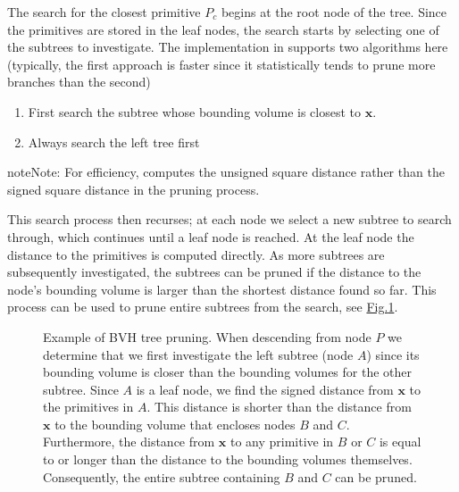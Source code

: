 \documentclass[letterpaper,10pt,english]{sphinxmanual}
\let\sphinxpxdimen\pdfpxdimen\else\newdimen\sphinxpxdimen
\begin{document}
The search for the closest primitive \(P_c\) begins at the root node of the tree.
Since the primitives are stored in the leaf nodes, the search starts by selecting one of the sub\sphinxhyphen{}trees to investigate.
The implementation in  supports two algorithms here (typically, the first approach is faster since it statistically tends to prune more branches than the second)
\begin{enumerate}
%
\item {} 
First search the sub\sphinxhyphen{}tree whose bounding volume is closest to \(\mathbf{x}\).

\item {} 
Always search the left tree first

\end{enumerate}

\begin{sphinxadmonition}{note}{Note:}
For efficiency,  computes the unsigned square distance rather than the signed square distance in the pruning process.
\end{sphinxadmonition}

This search process then recurses; at each node we select a new sub\sphinxhyphen{}tree to search through, which continues until a leaf node is reached.
At the leaf node the distance to the primitives is computed directly.
As more sub\sphinxhyphen{}trees are subsequently investigated, the sub\sphinxhyphen{}trees can be pruned if the distance to the node’s bounding volume is larger than the shortest distance found so far.
This process can be used to prune entire subtrees from the search, see \hyperref[\detokenize{Utilities/ComplexGeometries:fig-treepruning}]{Fig.\@ \ref{\detokenize{Utilities/ComplexGeometries:fig-treepruning}}}.

\begin{figure}[htb]
\centering
\capstart

\noindent\sphinxincludegraphics[width=480\sphinxpxdimen]{{TreePruning}.png}
\caption{Example of BVH tree pruning. When descending from node \(P\) we determine that we first investigate the left subtree (node \(A\)) since its bounding volume is closer than the bounding volumes for the other subtree.
Since \(A\) is a leaf node, we find the signed distance from \(\mathbf{x}\) to the primitives in \(A\).
This distance is shorter than the distance from \(\mathbf{x}\) to the bounding volume that encloses nodes \(B\) and \(C\).
Furthermore, the distance from \(\mathbf{x}\) to any primitive in \(B\) or \(C\) is equal to or longer than the distance to the bounding volumes themselves.
Consequently, the entire subtree containing \(B\) and \(C\) can be pruned.}\label{\detokenize{Utilities/ComplexGeometries:id6}}\label{\detokenize{Utilities/ComplexGeometries:fig-treepruning}}\end{figure}
\end{document}
